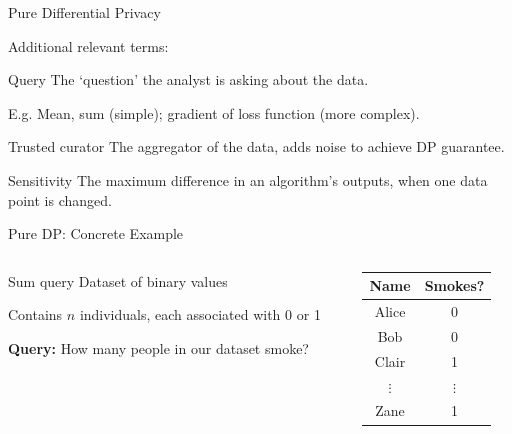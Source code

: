 \documentclass[12pt,aspectratio=169]{beamer}
\begin{document}
\begin{frame}{Pure Differential Privacy}

Additional relevant terms:

\vspace{3mm}

\begin{block}{Query}
The `question' the analyst is asking about the data.

E.g. Mean, sum (simple);  gradient of loss function (more complex).
\end{block}

\begin{block}{Trusted curator}
The aggregator of the data, adds noise to achieve DP guarantee.
\end{block}

\begin{block}{Sensitivity}
The maximum difference in an algorithm's outputs, when one data point is changed.
\end{block}

\end{frame}

\begin{frame}{Pure DP: Concrete Example}

\begin{columns}[T]

\begin{column}{.5\textwidth}

\begin{block}{Sum query}
Dataset of binary values

Contains $n$ individuals, each associated with 0 or 1

\textbf{Query:} How many people in our dataset smoke?
\end{block}

\end{column}

\begin{column}{.5\textwidth}

\begin{table}[]
    \centering
    \begin{tabular}{c|c}
    Name    &   Smokes?\\
    \hline
    Alice     &  0\\
    Bob     & 0\\
    Clair     & 1\\
    $\vdots$    & $\vdots$\\
    Zane    &   1\\
    \end{tabular}
\end{table}

\end{column}
\end{columns}

\end{frame}
\end{document}
